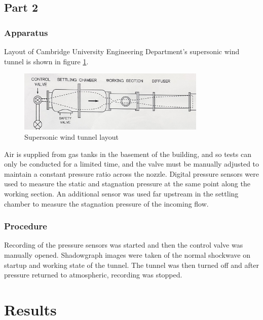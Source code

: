 \documentclass{article}
\begin{document}
\subsection{Part 2}

\subsubsection{Apparatus}

Layout of Cambridge University Engineering Department's supersonic wind tunnel is shown in figure \ref{fig:supersonic_tunnel}.

\begin{figure}[H]
    \centering
    \includegraphics[width=0.8\textwidth]{supersonic_layout.png}
    \caption{Supersonic wind tunnel layout}
    \label{fig:supersonic_tunnel}
\end{figure}

Air is supplied from gas tanks in the basement of the building, and so tests can only be conducted for a limited time, and the valve must be manually adjusted to maintain a constant pressure ratio across the nozzle.
Digital pressure sensors were used to measure the static and stagnation pressure at the same point along the working section.
An additional sensor was used far upstream in the settling chamber to measure the stagnation pressure of the incoming flow.

\subsubsection{Procedure}

Recording of the pressure sensors was started and then the control valve was manually opened.
Shadowgraph images were taken of the normal shockwave on startup and working state of the tunnel.
The tunnel was then turned off and after pressure returned to atmospheric, recording was stopped.

\section{Results}
\end{document}
